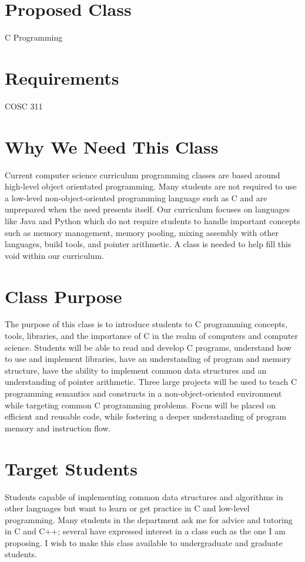 \documentclass[a4paper,12pt]{report}
\begin{document}
\section*{Proposed Class}
C Programming

\section*{Requirements}
COSC 311

\section*{Why We Need This Class}
Current computer science curriculum programming classes are based around high-level object orientated programming.  Many students are not required to use a low-level non-object-oriented programming language such as C and are unprepared when the need presents itself.  Our curriculum focuses on languages like Java and Python which do not require students to handle important concepts such as memory management, memory pooling, mixing assembly with other languages, build tools, and pointer arithmetic.  A class is needed to help fill this void within our curriculum.

\section*{Class Purpose}
The purpose of this class is to introduce students to C programming concepts, tools, libraries, and the importance of C in the realm of computers and computer science.  Students will be able to read and develop C programs, understand how to use and implement libraries, have an understanding of program and memory structure, have the ability to implement common data structures and an understanding of pointer arithmetic.  Three large projects will be used to teach C programming semantics and constructs in a non-object-oriented environment while targeting common C programming problems.  Focus will be placed on efficient and reusable code, while fostering a deeper understanding of program memory and instruction flow.  

\section*{Target Students}
Students capable of implementing common data structures and algorithms in other languages but want to learn or get practice in C and low-level programming.  Many students in the department ask me for advice and tutoring in C and C++; several have expressed interest in a class such as the one I am proposing.  I wish to make this class available to undergraduate and graduate students.
\end{document}
